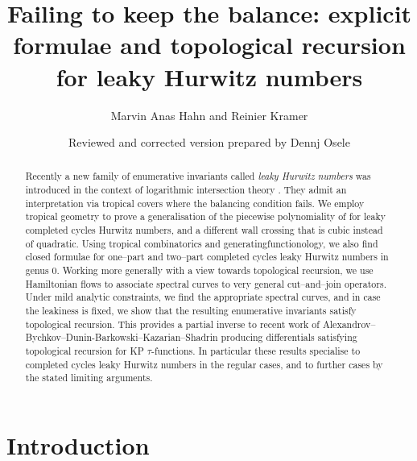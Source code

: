 \documentclass[10pt,a4paper,oneside,no-math,reqno]{amsart}%
\theoremstyle{plain}
\theoremstyle{definition}
\theoremstyle{remark}
\numberwithin{equation}{section}
\newcommand{\1}{\mathds{1}}
\newcommand{\<}{\langle}
\renewcommand{\>}{\rangle}
\begin{document}
\title[Failing to keep the balance]{Failing to keep the balance: explicit formulae and topological recursion for leaky Hurwitz numbers}
\author{Marvin Anas Hahn and Reinier Kramer}
\date{\small Reviewed and corrected version prepared by Dennj Osele}


\begin{abstract}
    Recently a new family of enumerative invariants called \emph{leaky Hurwitz numbers} was introduced in the context of logarithmic intersection theory \cite{CMR25}. They admit an interpretation via tropical covers where the balancing condition fails. We employ tropical geometry to prove a generalisation of the piecewise polynomiality of \cite{AKL25} for leaky completed cycles Hurwitz numbers, and a different wall crossing that is cubic instead of quadratic. Using tropical combinatorics and generatingfunctionology, we also find closed formulae for one--part and two--part completed cycles leaky Hurwitz numbers in genus $0$. Working more generally with a view towards topological recursion, we use Hamiltonian flows to associate spectral curves to very general cut--and--join operators. Under mild analytic constraints, we find the appropriate spectral curves, and in case the leakiness is fixed, we show that the resulting enumerative invariants satisfy topological recursion. This provides a partial inverse to recent work of Alexandrov--Bychkov--Dunin-Barkowski--Kazarian--Shadrin \cite{ABDKS24a} producing differentials satisfying topological recursion for KP $\tau$-functions. In particular these results specialise to completed cycles leaky Hurwitz numbers in the regular cases, and to further cases by the stated limiting arguments.
    \end{abstract}

\maketitle


\tableofcontents

\section{Introduction}
\end{document}
